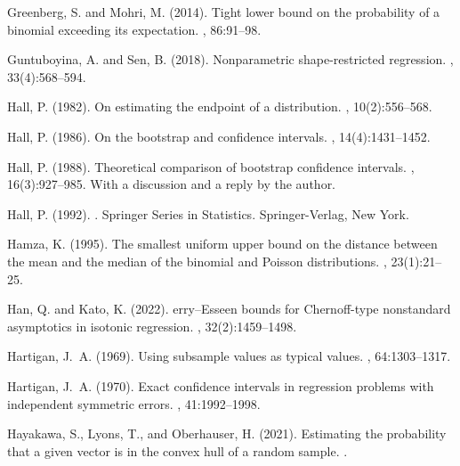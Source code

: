 \documentclass{article}
\numberwithin{myalgctr}{section}
\begin{document}
\begin{thebibliography}{}
Greenberg, S. and Mohri, M. (2014).
\newblock Tight lower bound on the probability of a binomial exceeding its
  expectation.
, 86:91--98.

Guntuboyina, A. and Sen, B. (2018).
\newblock Nonparametric shape-restricted regression.
, 33(4):568--594.

Hall, P. (1982).
\newblock On estimating the endpoint of a distribution.
, 10(2):556--568.

Hall, P. (1986).
\newblock On the bootstrap and confidence intervals.
, 14(4):1431--1452.

Hall, P. (1988).
\newblock Theoretical comparison of bootstrap confidence intervals.
, 16(3):927--985.
\newblock With a discussion and a reply by the author.

Hall, P. (1992).
.
\newblock Springer Series in Statistics. Springer-Verlag, New York.

Hamza, K. (1995).
\newblock The smallest uniform upper bound on the distance between the mean and
  the median of the binomial and {P}oisson distributions.
, 23(1):21--25.

Han, Q. and Kato, K. (2022).
erry--{E}sseen bounds for {C}hernoff-type nonstandard asymptotics
  in isotonic regression.
, 32(2):1459--1498.

Hartigan, J.~A. (1969).
\newblock Using subsample values as typical values.
, 64:1303--1317.

Hartigan, J.~A. (1970).
\newblock Exact confidence intervals in regression problems with independent
  symmetric errors.
, 41:1992--1998.

Hayakawa, S., Lyons, T., and Oberhauser, H. (2021).
\newblock Estimating the probability that a given vector is in the convex hull
  of a random sample.
.


\end{thebibliography}
\end{document}
